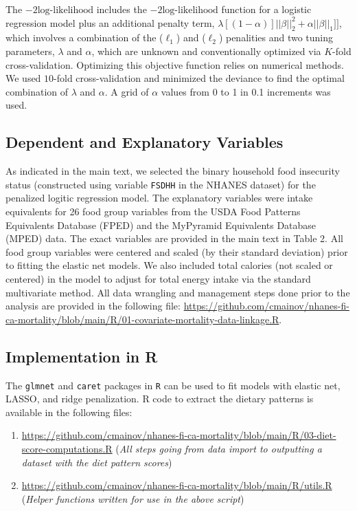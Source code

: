\documentclass{article}
\begin{document}
The $-2\text{log-likelihood}$ includes the $-2\text{log-likelihood}$ function for a logistic regression model plus an additional penalty term, $\lambda[(1-\alpha)]||\beta||_2^2+\alpha||\beta||_1]]$, which involves a combination of the ($\ell_1$) and ($\ell_2$) penalities and two tuning parameters, $\lambda$ and $\alpha$, which are unknown and conventionally optimized via $K$-fold cross-validation. Optimizing this objective function relies on numerical methods. \supercite{jin2009elastic} We used $10$-fold cross-validation and minimized the deviance to find the optimal combination of $\lambda$ and $\alpha$. A grid of $\alpha$ values from 0 to 1 in 0.1 increments was used. 

\subsection{Dependent and Explanatory Variables}
 \hspace{\parindent} As indicated in the main text, we selected the binary household food insecurity status (constructed using variable \texttt{FSDHH} in the NHANES dataset) for the penalized logitic regression model. The explanatory variables were intake equivalents for 26 food group variables from the USDA Food Patterns Equivalents Database (FPED) and the MyPyramid Equivalents Database (MPED) data. The exact variables are provided in the main text in Table 2. All food group variables were centered and scaled (by their standard deviation) prior to fitting the elastic net models. We also included total calories (not scaled or centered) in the model to adjust for total energy intake via the standard multivariate method.\supercite{willett1997adjustment} All data wrangling and management steps done prior to the analysis are provided in the following file: \textcolor{blue}{\url{https://github.com/cmainov/nhanes-fi-ca-mortality/blob/main/R/01-covariate-mortality-data-linkage.R}}.
 
\subsection{Implementation in R}
 \hspace{\parindent} The \texttt{glmnet} and \texttt{caret} packages in \texttt{R} can be used to fit models with elastic net, LASSO, and ridge penalization. R code to extract the dietary patterns is available in the following files:
\begin{enumerate}[label=(\roman*)]
 	\item \textcolor{blue}{\url{https://github.com/cmainov/nhanes-fi-ca-mortality/blob/main/R/03-diet-score-computations.R}} (\textit{All steps going from data import to outputting a dataset with the diet pattern scores})
 	\item \textcolor{blue}{\url{https://github.com/cmainov/nhanes-fi-ca-mortality/blob/main/R/utils.R}} (\textit{Helper functions written for use in the above script})
 \end{enumerate}
  
\end{document}
